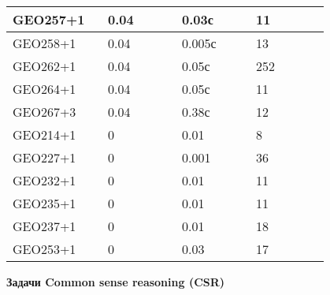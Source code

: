 \begin{longtable}[H]{|p{0.2\linewidth}|p{0.2\linewidth}|p{0.2\linewidth}|p{0.2\linewidth}|}
GEO257+1 &  0.04 &  0.03с &  11 \\
\hline
GEO258+1 &  0.04 &  0.005с &  13 \\
\hline
GEO262+1 &  0.04 &  0.05с &  252 \\
\hline
GEO264+1 &  0.04 &  0.05с &  11 \\
\hline
GEO267+3 &  0.04 &  0.38с &  12 \\
\hline
GEO214+1 &  0 &  0.01 &  8 \\
\hline
GEO227+1 &  0 &  0.001 &  36 \\
\hline
GEO232+1 &  0 &  0.01 &  11 \\
\hline
GEO235+1 &  0 &  0.01 &  11 \\
\hline
GEO237+1 &  0 &  0.01 &  18 \\
\hline
GEO253+1 &  0 &  0.03 &  17 \\
\hline
\end{longtable}





\textbf{Задачи Common sense reasoning (CSR)}


